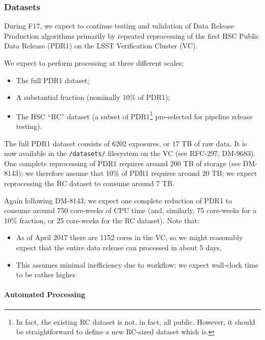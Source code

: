 
\subsubsection{Datasets}\label{datasets}

During F17, we expect to continue testing and validation of Data Release
Production algorithms primarily by repeated reprocessing of the first
HSC Public Data Release (PDR1) on the LSST Verification Cluster (VC).

We expect to perform processing at three different scales:

\begin{itemize}
\item
  The full PDR1 dataset;
\item
  A substantial fraction (nominally 10\% of PDR1);
\item
  The HSC ``RC'' dataset (a subset of PDR1\footnote{In fact,
    the existing RC dataset is not, in fact, all public. However, it
    should be straightforward to define a new RC-sized dataset which is.}
  pre-selected for pipeline release testing).
\end{itemize}

The full PDR1 dataset consists of 6202 exposures, or 17 TB of raw data.
It is now available in the \texttt{/datasets/} filesystem on the VC (see
RFC-297, DM-9683). One complete reprocessing of PDR1 requires around 200
TB of storage (see DM-8143); we therefore assume that 10\% of PDR1
requires around 20 TB; we expect reprocessing the RC dataset to consume
around 7 TB.

Again following DM-8143, we expect one complete reduction of PDR1 to
consume around 750 core-weeks of CPU time (and, similarly, 75 core-weeks
for a 10\% fraction, or 25 core-weeks for the RC dataset). Note that:

\begin{itemize}
\item
  As of April 2017 there are 1152 cores in the VC, so we might
  reasonably expect that the entire data release can processed in about
  5 days.
\item
  This assumes minimal inefficiency due to workflow; we expect
  wall-clock time to be rather higher.
\end{itemize}

\paragraph{Automated Processing}\label{automated-processing}

